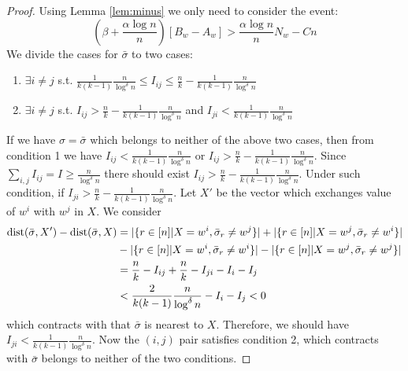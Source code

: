 \documentclass{article}
\begin{document}
\begin{proof}
	Using Lemma \ref{lem:minus} we only need to consider the event:
	\begin{equation}\label{eq:BwA}
	(\beta + \frac{\alpha \log n}{n})[B_w - A_w] >  \frac{\alpha \log n}{n} N_w  - Cn
	\end{equation}
	We divide the cases for $\bar{\sigma}$ to two cases:
	\begin{enumerate}
		\item $\exists i\neq j$ s.t. $\frac{1}{k(k-1)}\frac{n}{\log^{\delta} n} \leq I_{ij} \leq \frac{n}{k} - \frac{1}{k(k-1)}\frac{n}{\log^{\delta} n}$
		\item $\exists i \neq j$ s.t. $I_{ij} > \frac{n}{k} - \frac{1}{k(k-1)}\frac{n}{\log^{\delta} n}$ and $I_{ji} < \frac{1}{k(k-1)}\frac{n}{\log^{\delta} n}$
	\end{enumerate}
	If we have $\sigma = \bar{\sigma}$ which belongs to neither of the above two cases, then from condition 1 we have
	$I_{ij} < \frac{1}{k(k-1)}\frac{n}{\log^{\delta} n}$ or $I_{ij} > \frac{n}{k} - \frac{1}{k(k-1)}\frac{n}{\log^{\delta} n}$.
	Since $\sum_{i,j} I_{ij} = I \geq \frac{n}{\log^{\delta} n}$ there should exist $I_{ij} > \frac{n}{k} - \frac{1}{k(k-1)}\frac{n}{\log^{\delta} n}$.
	Under such condition, if $I_{ji} > \frac{n}{k} - \frac{1}{k(k-1)}\frac{n}{\log^{\delta} n}$.
	Let $X'$ be the vector which exchanges value of $w^i$ with $w^j$ in $X$. We consider
	\begin{align*}
	\operatorname{dist}(\bar{\sigma}, X') - \operatorname{dist}(\bar{\sigma}, X) &= |\{ r \in [n]|X=w^i, \bar{\sigma}_r \neq w^j \}| + |\{ r \in [n]|X=w^j, \bar{\sigma}_r \neq w^i \}| \\
	&-|\{ r \in [n]|X=w^i, \bar{\sigma}_r \neq w^i \}| - |\{ r \in [n]|X=w^j, \bar{\sigma}_r \neq w^j \}| \\
	& = \frac{n}{k} - I_{ij} +  \frac{n}{k} - I_{ji} - I_i - I_j \\
	& < \frac{2}{k(k-1)}\frac{n}{\log^{\delta} n} - I_i - I_j < 0
	\end{align*}
	which contracts with that $\bar{\sigma}$ is nearest to $X$.
	Therefore, we should have $I_{ji} < \frac{1}{k(k-1)}\frac{n}{\log^{\delta} n}$.
	Now the $(i, j)$ pair satisfies condition 2, which contracts with $\bar{\sigma}$ belongs to neither of the two conditions.
	

\end{proof}
\end{document}
